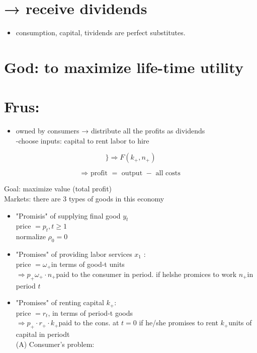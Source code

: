 \documentclass[10pt]{article}
\begin{document}
\section*{→ receive dividends}
\begin{itemize}
  \item consumption, capital, tividends are perfect substitutes.
\end{itemize}

\section*{God: to maximize life-time utility}
\section*{Frus:}
\begin{itemize}
  \item owned by consumers → distribute all the profits as dividends\\
-choose inputs: capital to rent labor to hire
\end{itemize}

$$
\} \Rightarrow F\left(k_{+}, n_{+}\right)
$$

$$
\text { ⇒ profit }=\text { output }- \text { all costs }
$$

Goal: maximize value (total profit)\\
Markets: there are 3 types of goods in this economy

\begin{itemize}
  \item "Promisis" of supplying final good $y_{t}$\\
price $=p_{t}, t \geqslant 1$\\
normalize $\rho_{0}=0$
  \item "Promises" of providing labor services $x_{1}$ :\\
price $=\omega_{+}$in terms of good-t units\\
$\Rightarrow p_{+} \omega_{+} \cdot n_{+}$paid to the consumer in period. if helshe promices to work $n_{+}$in period $t$
  \item "Promises" of renting capital $k_{+}$:\\
price $=r_{t}$, in terms of period-t goods\\
$\Rightarrow p_{+} \cdot r_{+} \cdot k_{+}$paid to the cons. at $t=0$ if he/she promises to rent $k_{+}$units of capital in periodt\\
(A) Consumer's problem:
\end{itemize}
\end{document}
